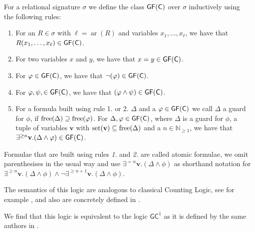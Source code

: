 \begin{definition}
	\label{def:GFC}
	For a relational signature $\sigma$ we define the class $\mathsf{GF}(\mathsf{C})$ over $\sigma$ inductively using the following rules:
	\begin{enumerate}
		\item For an $R\in\sigma$ with $\ell=\operatorname{ar}(R)$ and variables $x_1,\dots,x_\ell$, we have that $R(x_1,\dots,x_\ell)\in \mathsf{GF}(\mathsf{C})$.
		\item For two variables $x$ and $y$, we have that $x=y\in\mathsf{GF}(\mathsf{C})$.
		\item For $\varphi\in\mathsf{GF}(\mathsf{C})$, we have that $\neg(\varphi)\in\mathsf{GF}(\mathsf{C})$.
		\item For $\varphi,\psi,\in\mathsf{GF}(\mathsf{C})$, we have that $(\varphi\land\psi)\in\mathsf{GF}(\mathsf{C})$.
		\item For a formula built using rule 1. or 2. $\Delta$ and a $\varphi\in\mathsf{GF}(\mathsf{C})$ we call $\Delta$ a guard for $\phi$, if $\operatorname{free}(\Delta)\supseteq\operatorname{free}(\varphi)$.
		For $\Delta,\varphi\in \mathsf{GF}(\mathsf{C})$, where $\Delta$ is a guard for $\phi$, a tuple of variables $\mathbf v$ with $\operatorname{set}(\mathbf v)\subseteq \operatorname{free}(\Delta)$ and a $n\in \mathbb N_{\geq 1}$, we have that $\exists^{\geq n}\mathbf v . (\Delta \land \varphi)\in \mathsf{GF}(\mathsf{C})$.
	\end{enumerate}
	Formulae that are built using rules \emph{1.} and \emph{2.} are called atomic formulae, we omit parenthesises in the usual way and use $\exists^{=n}\mathbf v.(\Delta\land\phi)$ as shorthand notation for $\exists^{\geq n}\mathbf v.(\Delta\land\phi)\land \neg\exists^{\geq n+1}\mathbf v.(\Delta\land\phi)$.
	
	The semantics of this logic are analogous to classical Counting Logic, see for example \cite{cai1992OptimalLower}, and also are concretely defined in \cite{scheidt2025ColorRefinement}.
\end{definition}
We find that this logic is equivalent to the logic $\mathsf{GC}^1$ as it is defined by the same authors in \cite{scheidt2023CountingHomomorphisms}.

